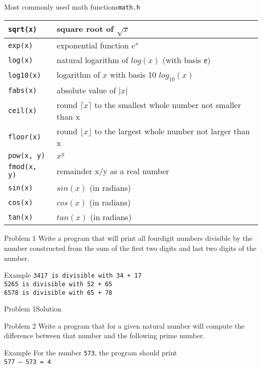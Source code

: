 \begin{frame}{Most commonly used math functions}{\texttt{math.h}}
\begin{tabular}{l | l}
\texttt{sqrt(x)} &  square root of $\sqrt{x}$\\
\hline
\texttt{exp(x)} & exponential function  $e^x$\\
\hline
\texttt{log(x)} & natural logarithm of $log(x)$ (with basis е)\\
\hline
\texttt{log10(x)} & logarithm of $x$ with basis 10 $log_{10}(x)$ \\
\hline
\texttt{fabs(x)} & absolute value of $|x|$\\
\hline
\texttt{ceil(x)} & round $\lceil{x}\rceil$ to the smallest whole number not
smaller than x\\
\hline
\texttt{floor(x)} & round $\lfloor{x}\rfloor$ to the largest whole number not
larger than x\\
\hline
\texttt{pow(x, y)}  & $x^y$\\
\hline
\texttt{fmod(x, y)}  & remainder x/y as a real number\\
\hline
\texttt{sin(x)} & $sin(x)$ (in radians) \\
\hline
\texttt{cos(x)} & $cos(x)$ (in radians)\\
\hline
\texttt{tan(x)} & $tan(x)$ (in radians)
\end{tabular}

\end{frame}

\begin{frame}{Problem 1}
Write a program that will print all fourdigit numbers divisible by the number
constructed from the sum of the first two digits and last two digits of the
number.
\begin{exampleblock}{Example}
\texttt{3417 is divisible with 34 + 17}\\
\texttt{5265 is divisible with 52 + 65}\\
\texttt{6578 is divisible with 65 + 78}
\end{exampleblock}
\end{frame}

\begin{frame}[fragile]{Problem 1}{Solution}

\end{frame}


\begin{frame}{Problem 2}
Write a program that for a given natural number will compute the difference
between that number and the following prime number.
\begin{exampleblock}{Example}
For the number \texttt{573}, the program should print\\
\texttt{577 – 573 = 4}
\end{exampleblock}
\end{frame}

